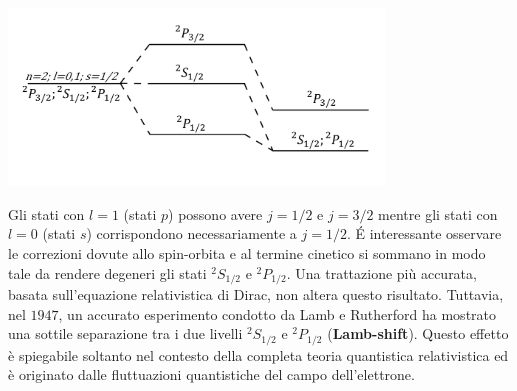 \documentclass[a4paper,12pt,oneside]{book}
\begin{document}
\begin{center}
\includegraphics[width=10cm]{immagini/cap_25/fig25_1.png}
\end{center}
Gli stati con $l=1$ (stati $p$) possono avere $j=1/2$ e $j=3/2$ mentre gli stati con $l=0$ (stati $s$) corrispondono necessariamente a $j=1/2$. \'E interessante osservare le correzioni dovute allo spin-orbita e al termine cinetico si sommano in modo tale da rendere degeneri gli stati $^2S_{1/2}$ e $^2P_{1/2}$.
Una trattazione più accurata, basata sull'equazione relativistica di Dirac, non altera questo risultato. Tuttavia, nel $1947$, un accurato esperimento condotto da Lamb e Rutherford ha mostrato una sottile separazione tra i due livelli $^2S_{1/2}$ e $^2P_{1/2}$ (\textbf{Lamb-shift}). Questo effetto è spiegabile soltanto nel contesto della completa teoria quantistica relativistica ed è originato dalle fluttuazioni quantistiche del campo dell'elettrone.
\end{document}
